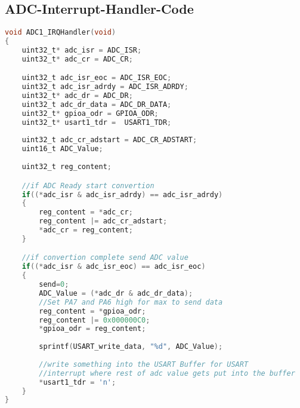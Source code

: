     \subsection{ADC-Interrupt-Handler-Code}
        \begin{lstlisting}[language=C, style=CStyle, caption=ADC-Interrupt-Handler-Code, captionpos=b, label=ADC-Interrupt-Handler-Code]
void ADC1_IRQHandler(void)   
{
    uint32_t* adc_isr = ADC_ISR;
    uint32_t* adc_cr = ADC_CR;

    uint32_t adc_isr_eoc = ADC_ISR_EOC;
    uint32_t adc_isr_adrdy = ADC_ISR_ADRDY;
    uint32_t* adc_dr = ADC_DR;
    uint32_t adc_dr_data = ADC_DR_DATA;
    uint32_t* gpioa_odr = GPIOA_ODR;
    uint32_t* usart1_tdr =  USART1_TDR;
    
    uint32_t adc_cr_adstart = ADC_CR_ADSTART;
    uint16_t ADC_Value;
    
    uint32_t reg_content;

    //if ADC Ready start convertion
    if((*adc_isr & adc_isr_adrdy) == adc_isr_adrdy)
    {
        reg_content = *adc_cr;
        reg_content |= adc_cr_adstart;
        *adc_cr = reg_content;
    }

    //if convertion complete send ADC value
    if((*adc_isr & adc_isr_eoc) == adc_isr_eoc)
    {
        send=0;
        ADC_Value = (*adc_dr & adc_dr_data);
        //Set PA7 and PA6 high for max to send data
        reg_content = *gpioa_odr;
        reg_content |= 0x000000C0;
        *gpioa_odr = reg_content;
        
        sprintf(USART_write_data, "%d", ADC_Value);
    
        //write something into the USART Buffer for USART
        //interrupt where rest of adc value gets put into the buffer
        *usart1_tdr = 'n'; 
    }
}
        \end{lstlisting}